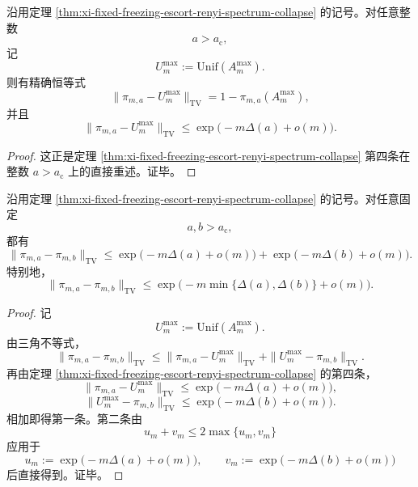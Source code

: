 \begin{corollary}\label{cor:xi-fixed-freezing-escort-groundstate-tv-identity}
沿用定理 \ref{thm:xi-fixed-freezing-escort-renyi-spectrum-collapse} 的记号。对任意整数
\[
a>a_{\mathrm c},
\]
记
\[
U_m^{\max}:=\mathrm{Unif}(A_m^{\max}).
\]
则有精确恒等式
\[
\|\pi_{m,a}-U_m^{\max}\|_{\mathrm{TV}}
=
1-\pi_{m,a}(A_m^{\max}),
\]
并且
\[
\|\pi_{m,a}-U_m^{\max}\|_{\mathrm{TV}}
\le
\exp\!\bigl(-m\Delta(a)+o(m)\bigr).
\]
\end{corollary}
\begin{proof}
这正是定理 \ref{thm:xi-fixed-freezing-escort-renyi-spectrum-collapse} 第四条在整数
\(
a>a_{\mathrm c}
\)
上的直接重述。证毕。
\end{proof}

\begin{corollary}\label{cor:xi-fixed-freezing-escort-pairwise-tv-coalescence}
沿用定理 \ref{thm:xi-fixed-freezing-escort-renyi-spectrum-collapse} 的记号。对任意固定
\[
a,b>a_{\mathrm c},
\]
都有
\[
\|\pi_{m,a}-\pi_{m,b}\|_{\mathrm{TV}}
\le
\exp\!\bigl(-m\Delta(a)+o(m)\bigr)
+
\exp\!\bigl(-m\Delta(b)+o(m)\bigr).
\]
特别地，
\[
\|\pi_{m,a}-\pi_{m,b}\|_{\mathrm{TV}}
\le
\exp\!\bigl(-m\min\{\Delta(a),\Delta(b)\}+o(m)\bigr).
\]
\end{corollary}
\begin{proof}
记
\[
U_m^{\max}:=\mathrm{Unif}(A_m^{\max}).
\]
由三角不等式，
\[
\|\pi_{m,a}-\pi_{m,b}\|_{\mathrm{TV}}
\le
\|\pi_{m,a}-U_m^{\max}\|_{\mathrm{TV}}
+
\|U_m^{\max}-\pi_{m,b}\|_{\mathrm{TV}}.
\]
再由定理 \ref{thm:xi-fixed-freezing-escort-renyi-spectrum-collapse} 的第四条，
\[
\|\pi_{m,a}-U_m^{\max}\|_{\mathrm{TV}}
\le
\exp\!\bigl(-m\Delta(a)+o(m)\bigr),
\]
\[
\|U_m^{\max}-\pi_{m,b}\|_{\mathrm{TV}}
\le
\exp\!\bigl(-m\Delta(b)+o(m)\bigr).
\]
相加即得第一条。第二条由
\[
u_m+v_m
\le
2\max\{u_m,v_m\}
\]
应用于
\[
u_m:=\exp\!\bigl(-m\Delta(a)+o(m)\bigr),
\qquad
v_m:=\exp\!\bigl(-m\Delta(b)+o(m)\bigr)
\]
后直接得到。证毕。
\end{proof}
